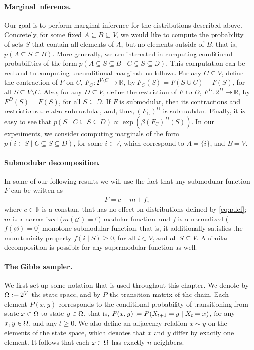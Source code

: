 \paragraph{Marginal inference.}
Our goal is to perform marginal inference for the distributions described above.
Concretely, for some fixed $A \subseteq B \subseteq V$, we would like to compute the probability of sets $S$ that contain all elements of $A$, but no elements outside of $B$, that is, $p(A \subseteq S \subseteq B)$.
More generally, we are interested in computing conditional probabilities of the form $p(A \subseteq S \subseteq B \mid C \subseteq S \subseteq D)$.
This computation can be reduced to computing unconditional marginals as follows.
For any $C \subseteq V$, define the contraction of $F$ on $C$, $F_C : 2^{V \setminus C} \to \mathbb{R}$, by $F_C(S) = F(S \cup C) - F(S)$, for all $S \subseteq V \setminus C$.
Also, for any $D \subseteq V$, define the restriction of $F$ to $D$, $F^D : 2^D \to \mathbb{R}$, by $F^D(S) = F(S)$, for all $S \subseteq D$.
If $F$ is submodular, then its contractions and restrictions are also submodular, and, thus, $(F_C)^D$ is submodular.
Finally, it is easy to see that $p(S \mid C \subseteq S \subseteq D) \propto \exp(\beta (F_C)^D(S))$.
In our experiments, we consider computing marginals of the form $p(i \in S \mid C \subseteq S \subseteq D)$, for some $i \in V$, which correspond to $A = \{i\}$, and $B = V$.

\paragraph{Submodular decomposition.}
In some of our following results we will use the fact that any submodular function $F$ can be written as
\begin{align} \label{eq:decomp}
  F = c + m + f,
\end{align}
where $c \in \mathbb{R}$ is a constant that has no effect on distributions defined by \eqref{eq:pdef}; $m$ is a normalized ($m(\varnothing) = 0$) modular function; and $f$ is a normalized ($f(\varnothing) = 0$) monotone submodular function, that is, it additionally satisfies the monotonicity property $f(i\mid S) \geq 0$, for all $i \in V$, and all $S \subseteq V$.
A similar decomposition is possible for any supermodular function as well.

\paragraph{The Gibbs sampler.}
We first set up some notation that is used throughout this chapter.
We denote by $\ss \defeq 2^V$ the state space, and by $P$ the transition matrix of the chain.
Each element $P(x, y)$ corresponds to the conditional probability of transitioning from state $x \in \ss$ to state $y \in \ss$, that is, $P(x, y) \defeq P(X_{t+1} = y \mid X_{t} = x)$, for any $x, y \in \ss$, and any $t \geq 0$.
We also define an adjacency relation $x \sim y$ on the elements of the state space, which denotes that $x$ and $y$ differ by exactly one element.
It follows that each $x \in \ss$ has exactly $n$ neighbors.

